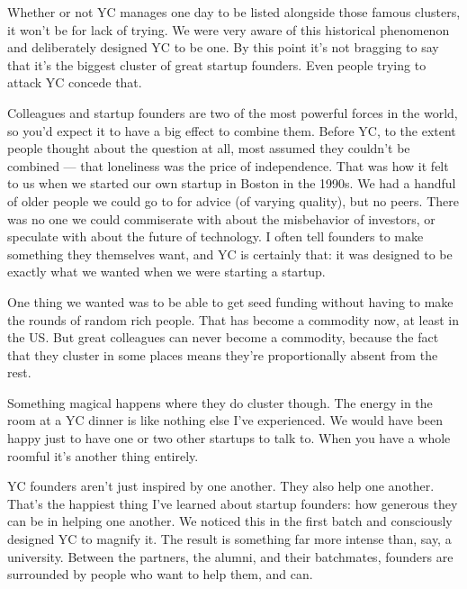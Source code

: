 Whether or not YC manages one day to
                  be listed alongside those famous clusters, it won't be for
                  lack of trying. We were very aware of this historical
                  phenomenon and deliberately designed YC to be one. By this
                  point it's not bragging to say that it's the biggest cluster
                  of great startup founders. Even people trying to attack YC
                  concede that.

Colleagues and startup founders are
                  two of the most powerful forces in the world, so you'd expect
                  it to have a big effect to combine them. Before YC, to the
                  extent people thought about the question at all, most assumed
                  they couldn't be combined --- that loneliness was the
                  price of independence. That was how it felt to us when we
                  started our own startup in Boston in the 1990s. We had a
                  handful of older people we could go to for advice (of varying
                  quality), but no peers. There was no one we could commiserate
                  with about the misbehavior of investors, or speculate with
                  about the future of technology. I often tell founders to make
                  something they themselves want, and YC is certainly that: it
                  was designed to be exactly what we wanted when we were
                  starting a startup.

One thing we wanted was to be
                  able to get seed funding without having to make the rounds of
                  random rich people. That has become a commodity now, at least
                  in the US. But great colleagues can never become a commodity,
                  because the fact that they cluster in some places means
                  they're proportionally absent from the rest.

Something
                  magical happens where they do cluster though. The energy in
                  the room at a YC dinner is like nothing else I've experienced.
                  We would have been happy just to have one or two other
                  startups to talk to. When you have a whole roomful it's
                  another thing entirely.

YC founders aren't just
                  inspired by one another. They also help one another. That's
                  the happiest thing I've learned about startup founders: how
                  generous they can be in helping one another. We noticed this
                  in the first batch and consciously designed YC to magnify it.
                  The result is something far more intense than, say, a
                  university. Between the partners, the alumni, and their
                  batchmates, founders are surrounded by people who want to help
                  them, and can.











